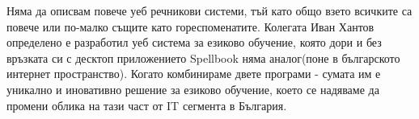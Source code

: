 Няма да описвам повече уеб речникови системи, тъй като общо взето
всичките са повече или по-малко същите като гореспоменатите. Колегата
Иван Хантов определено е разработил уеб система за езиково обучение,
която дори и без връзката си с десктоп приложението Spellbook няма
аналог(поне в българското интернет пространство). Когато комбинираме
двете програми - сумата им е уникално и иновативно решение за езиково
обучение, което се надяваме да промени облика на тази част от IT
сегмента в България.

